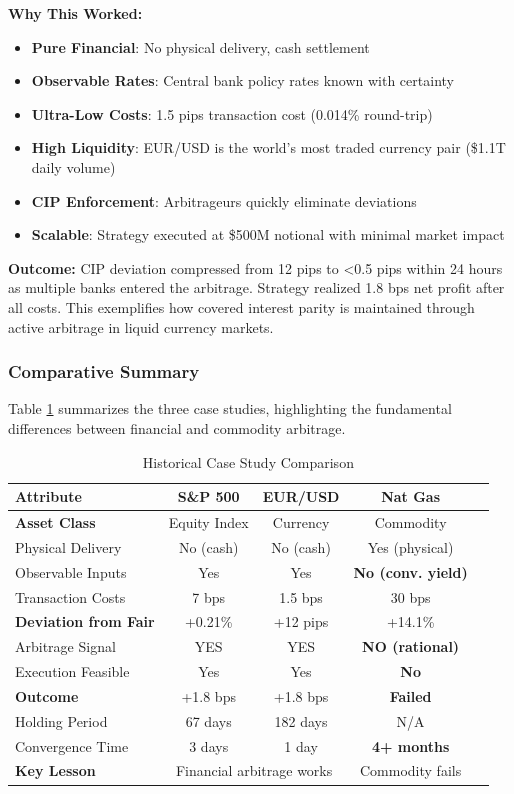 \documentclass[12pt,a4paper]{article}
\begin{document}
\textbf{Why This Worked:}

\begin{itemize}
    \item \textbf{Pure Financial}: No physical delivery, cash settlement
    \item \textbf{Observable Rates}: Central bank policy rates known with certainty
    \item \textbf{Ultra-Low Costs}: 1.5 pips transaction cost (0.014\% round-trip)
    \item \textbf{High Liquidity}: EUR/USD is the world's most traded currency pair (\$1.1T daily volume)
    \item \textbf{CIP Enforcement}: Arbitrageurs quickly eliminate deviations
    \item \textbf{Scalable}: Strategy executed at \$500M notional with minimal market impact
\end{itemize}

\textbf{Outcome:} CIP deviation compressed from 12 pips to <0.5 pips within 24 hours as multiple banks entered the arbitrage. Strategy realized 1.8 bps net profit after all costs. This exemplifies how covered interest parity is maintained through active arbitrage in liquid currency markets.

\subsubsection{Comparative Summary}

Table \ref{tab:case_summary} summarizes the three case studies, highlighting the fundamental differences between financial and commodity arbitrage.

\begin{table}[H]
\centering
\caption{Historical Case Study Comparison}
\label{tab:case_summary}
\begin{tabular}{@{}lcccc@{}}
\toprule
\textbf{Attribute} & \textbf{S\&P 500} & \textbf{EUR/USD} & \textbf{Nat Gas} \\
\midrule
\textbf{Asset Class} & Equity Index & Currency & Commodity \\
Physical Delivery & No (cash) & No (cash) & Yes (physical) \\
Observable Inputs & Yes & Yes & \textbf{No (conv. yield)} \\
Transaction Costs & 7 bps & 1.5 bps & 30 bps \\
\midrule
\textbf{Deviation from Fair} & +0.21\% & +12 pips & +14.1\% \\
Arbitrage Signal & YES & YES & \textbf{NO (rational)} \\
Execution Feasible & Yes & Yes & \textbf{No} \\
\midrule
\textbf{Outcome} & +1.8 bps & +1.8 bps & \textbf{Failed} \\
Holding Period & 67 days & 182 days & N/A \\
Convergence Time & 3 days & 1 day & \textbf{4+ months} \\
\midrule
\textbf{Key Lesson} & \multicolumn{2}{c}{Financial arbitrage works} & Commodity fails \\
\bottomrule
\end{tabular}
\end{table}
\end{document}
